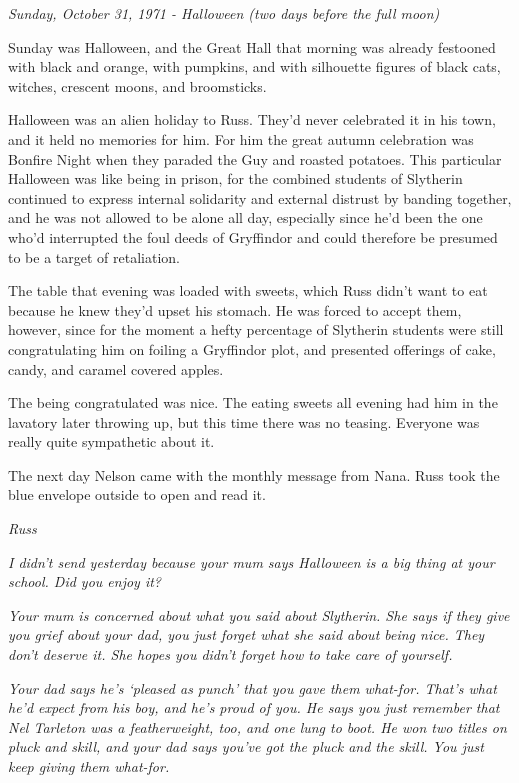 \documentclass[a4paper,11pt]{article}
\begin{document}
\emph{Sunday, October 31, 1971 - Halloween (two days before the full moon)}

Sunday was Halloween, and the Great Hall that morning was already festooned with black and orange, with pumpkins, and with silhouette figures of black cats, witches, crescent moons, and broomsticks.

Halloween was an alien holiday to Russ. They'd never celebrated it in his town, and it held no memories for him. For him the great autumn celebration was Bonfire Night when they paraded the Guy and roasted potatoes. This particular Halloween was like being in prison, for the combined students of Slytherin continued to express internal solidarity and external distrust by banding together, and he was not allowed to be alone all day, especially since he'd been the one who'd interrupted the foul deeds of Gryffindor and could therefore be presumed to be a target of retaliation.

The table that evening was loaded with sweets, which Russ didn't want to eat because he knew they'd upset his stomach. He was forced to accept them, however, since for the moment a hefty percentage of Slytherin students were still congratulating him on foiling a Gryffindor plot, and presented offerings of cake, candy, and caramel covered apples.

The being congratulated was nice. The eating sweets all evening had him in the lavatory later throwing up, but this time there was no teasing. Everyone was really quite sympathetic about it.

The next day Nelson came with the monthly message from Nana. Russ took the blue envelope outside to open and read it.

\emph{Russ}

\emph{I didn't send yesterday because your mum says Halloween is a big thing at your school. Did you enjoy it?}

\emph{Your mum is concerned about what you said about Slytherin. She says if they give you grief about your dad, you just forget what she said about being nice. They don't deserve it. She hopes you didn't forget how to take care of yourself.}

\emph{Your dad says he's `pleased as punch' that you gave them what-for. That's what he'd expect from his boy, and he's proud of you. He says you just remember that Nel Tarleton was a featherweight, too, and one lung to boot. He won two titles on pluck and skill, and your dad says you've got the pluck and the skill. You just keep giving them what-for.}
\end{document}
